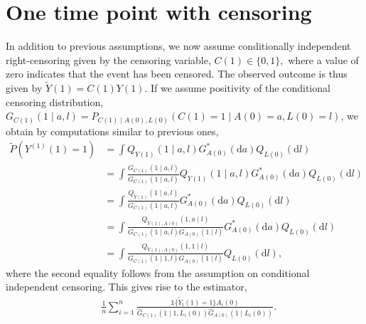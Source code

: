 \documentclass{article}
\newcommand{\A}[1]{A(#1)}
\renewcommand{\L}[1]{L(#1)}
\newcommand{\Y}[1]{Y(#1)}
\newcommand{\C}[1]{C(#1)}
\newcommand{\Ytilde}[1]{\tilde{Y}(#1)}
\newcommand{\Ystar}[2]{Y^{(#1)}(#2)}
\newcommand{\Asubs}[2]{A_{#1}(#2)}
\newcommand{\Lsubs}[2]{L_{#1}(#2)}
\newcommand{\Ytsubs}[2]{\tilde{Y}_{#1}(#2)}
\renewcommand{\d}{\ensuremath{\mathrm{d}}}
\begin{document}
\section{One time point with censoring}
In addition to previous assumptions, we now assume conditionally independent right-censoring given by the censoring variable, $\C{1}\in\{0,1\},$ where a value of zero indicates that the event has been censored. The observed outcome is thus given by $\Ytilde{1}=\C{1}\Y{1}$. If we assume positivity of the conditional censoring distribution, $G_{\C{1}}(1\mid a,l)=P_{\C{1}\mid \A{0},\L{0}}(\C{1}=1\mid \A{0}=a, \L{0}=l)$, we obtain by computations similar to previous ones,
\begin{align*}
    \tilde{P}(\Ystar{1}{1}=1)&=\int Q_{\Y{1}}(1\mid a,l)G^*_{\A{0}}(\d a)Q_{\L{0}}(\d l)\\
    &=\int\frac{G_{\C{1}}(1\mid a,l)}{G_{\C{1}}(1\mid a,l)}Q_{\Y{1}}(1\mid a,l)G^*_{\A{0}}(\d a)Q_{\L{0}}(\d l)\\
    &=\int\frac{Q_{\Ytilde{1}}(1\mid a,l)}{G_{\C{1}}(1\mid a,l)}G^*_{\A{0}}(\d a)Q_{\L{0}}(\d l)\\
    &=\int\frac{Q_{\Ytilde{1},\A{0}}(1,a\mid l)}{G_{\C{1}}(1\mid a,l)G_{\A{0}}(1\mid l)}G^*_{\A{0}}(\d a)Q_{\L{0}}(\d l)\\
    &=\int\frac{Q_{\Ytilde{1},\A{0}}(1,1\mid l)}{G_{\C{1}}(1\mid 1,l)G_{\A{0}}(1\mid l)}Q_{\L{0}}(\d l),
\end{align*}
where the second equality follows from the assumption on conditional independent censoring. This gives rise to the estimator,
\begin{align*}
    &\frac{1}{n}\sum_{i=1}^n\frac{\mathds{1}\{\Ytsubs{i}{1}=1\}\Asubs{i}{0}}{\hat{G}_{\C{1}}(1\mid 1,\Lsubs{i}{0})\hat{G}_{\A{0}}(1\mid \Lsubs{i}{0})}.\tag{IPCW}
\end{align*}
\end{document}
